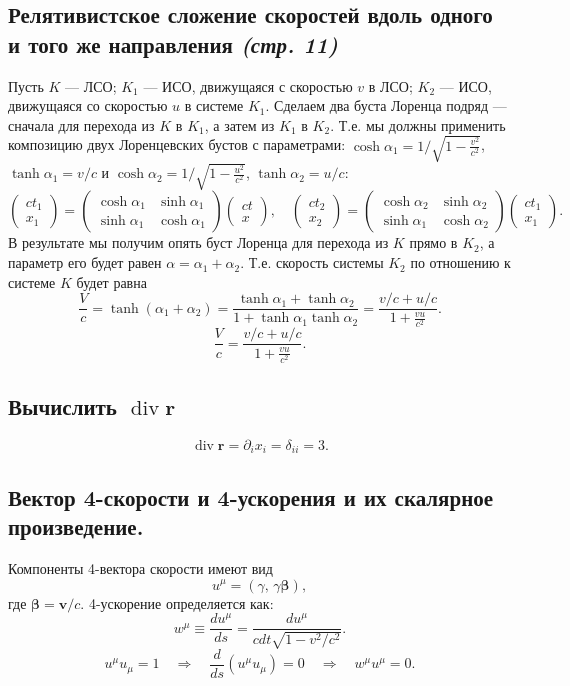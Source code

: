 \documentclass[a4paper,12pt]{article}
\begin{document}
\subsection{Релятивистское сложение скоростей вдоль одного и того же
направления \emph{(стр. 11)}}
Пусть $K$ --- ЛСО; $K_1$ --- ИСО, движущаяся с скоростью $v$ в ЛСО;
$K_2$ --- ИСО, движущаяся со скоростью $u$ в системе  $K_1$.
Сделаем два буста Лоренца подряд --- сначала для перехода из  $K$ в $K_1$,
а затем из  $K_1$ в  $K_2$. Т.\:е. мы должны применить композицию двух
Лоренцевских бустов с параметрами: $\cosh \alpha_1 = 1 /\sqrt{1-\frac{v^2}{c ^2}} $,
$\tanh \alpha_1=v /c$ и $\cosh  \alpha_2=1 /\sqrt{1- \frac{u^2}{c^2}} $,
$\tanh \alpha_2 =u /c$:
\[
\begin{pmatrix} ct_1 \\ x_1 \end{pmatrix} =
\begin{pmatrix} \cosh \alpha_1  & \sinh \alpha_1 \\
\sinh \alpha_1 & \cosh \alpha_1\end{pmatrix} 
\begin{pmatrix} ct \\ x \end{pmatrix}, \quad
\begin{pmatrix} ct_2 \\ x_2 \end{pmatrix} =
\begin{pmatrix} \cosh \alpha_2  & \sinh \alpha_2 \\
\sinh \alpha_1 & \cosh \alpha_2\end{pmatrix} 
\begin{pmatrix} ct_1 \\ x_1 \end{pmatrix}
.\]
В результате мы получим опять буст Лоренца для перехода из $K$ прямо в $K_2$,
а параметр его будет равен $\alpha=\alpha_1+\alpha_2$.
Т.\:е. скорость системы $K_2 $ по отношению к  системе $K$ будет равна
 \[
	 \frac{V}{c}=\tanh (\alpha_1+\alpha_2)=
	 \frac{\tanh \alpha_1 +\tanh \alpha_2}{1 +\tanh \alpha_1 \tanh \alpha_2}=
	 \frac{v /c+u /c}{1+ \frac{vu}{c^2}}
.\] 
\[
\frac{V}{c}=\frac{v /c +u /c}{1+\frac{vu}{c^2}}
.\] 
\subsection{Вычислить $\operatorname{div} \mathbf{r}$}
\[
	\operatorname{div} \mathbf{r}=\partial_i x_i=\delta_{ii}=3
.\] 
\subsection{Вектор 4-скорости и 4-ускорения и их скалярное произведение.}
Компоненты 4-вектора скорости имеют вид
\[
	u^\mu=\left( \gamma,\,\gamma \boldsymbol{\beta} \right) 
,\] 
где $\boldsymbol{\beta}=\mathbf{v} /c$.
4-ускорение определяется как:
\[
w^\mu\equiv \frac{du^\mu}{ds}= \frac{du^\mu}{cdt\sqrt{1-v^2 /c^2} }
.\]
\[
	u^\mu u_\mu=1 \quad \Rightarrow \quad \frac{d}{ds}\left( u^\mu u_\mu \right) =0
	\quad \Rightarrow \quad w^\mu u^\mu=0
.\] 
\end{document}
